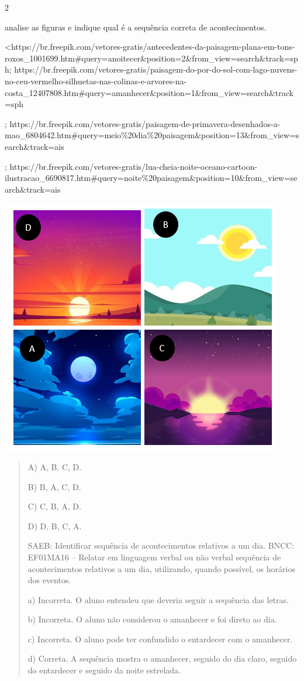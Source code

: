 \num{2}

analise as figuras e indique qual é a sequência correta de
acontecimentos.

\textless{}https://br.freepik.com/vetores-gratis/antecedentes-da-paisagem-plana-em-tons-roxos\_1001699.htm\#query=anoitecer\&position=2\&from\_view=search\&track=sph;
https://br.freepik.com/vetores-gratis/paisagem-do-por-do-sol-com-lago-nuvens-no-ceu-vermelho-silhuetas-nas-colinas-e-arvores-na-costa\_12407808.htm\#query=amanhecer\&position=1\&from\_view=search\&track=sph

;
https://br.freepik.com/vetores-gratis/paisagem-de-primavera-desenhados-a-mao\_6804642.htm\#query=meio\%20dia\%20paisagem\&position=13\&from\_view=search\&track=ais

;
https://br.freepik.com/vetores-gratis/lua-cheia-noite-oceano-cartoon-ilustracao\_6690817.htm\#query=noite\%20paisagem\&position=10\&from\_view=search\&track=ais

\includegraphics[width=4.85484in,height=4.39645in]{media/image46.png}

\begin{quote}
A) A, B, C, D.

B) B, A, C, D.

C) C, B, A, D.

D) D, B, C, A.

SAEB: Identificar sequência de acontecimentos relativos a um dia.
BNCC: EF01MA16 -- Relatar em linguagem verbal ou não verbal sequência de
acontecimentos relativos a um dia, utilizando, quando possível, os
horários dos eventos.

a) Incorreta. O aluno entendeu que deveria seguir a sequência das letras.

b) Incorreta. O aluno não considerou o amanhecer e foi direto ao dia.

c) Incorreta. O aluno pode ter confundido o entardecer com o amanhecer.

d) Correta. A sequência mostra o amanhecer, seguido do dia claro, seguido
do entardecer e seguido da noite estrelada.
\end{quote}

